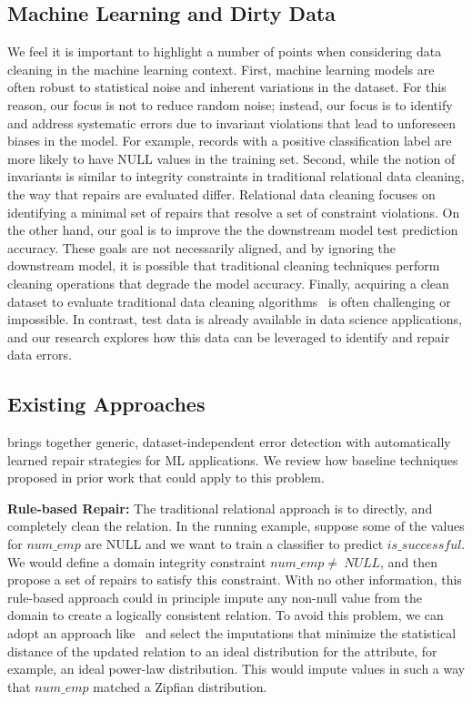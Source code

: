 \subsection{Machine Learning and Dirty Data}
We feel it is important to highlight a number of points when considering data cleaning in the machine learning context.
First, machine learning models are often robust to statistical noise and inherent variations in the dataset.  For this reason, our focus is not to reduce random noise; instead, our focus is to identify and address systematic errors due to invariant violations that lead to unforeseen biases in the model.  
For example, records with a positive classification label are more likely to have NULL values in the training set.
Second, while the notion of invariants is similar to integrity constraints in traditional relational data cleaning, the way that repairs are evaluated differ.  Relational data cleaning focuses on identifying a minimal set of repairs that resolve a set of constraint violations.  On the other hand, our goal is to improve the the downstream model test prediction accuracy.  These goals are not necessarily aligned, and by ignoring the downstream model, it is possible that traditional cleaning techniques perform cleaning operations that degrade the model accuracy.
Finally, acquiring a clean dataset to evaluate traditional data cleaning algorithms~\cite{DBLP:journals/pvldb/AbedjanCDFIOPST16} is often challenging or impossible.  In contrast, test data is already available in data science applications, and our research explores how this data can be leveraged to identify and repair data errors.

\subsection{Existing Approaches}
\sys brings together generic, dataset-independent error detection with automatically learned repair strategies for ML applications.
We review how baseline techniques proposed in prior work that could apply to this problem.

\vspace{0.5em}

\noindent\textbf{Rule-based Repair: } 
The traditional relational approach is to directly, and completely clean the relation.
In the running example, suppose some of the values for $num\_emp$ are NULL and we want to train a classifier to predict $is\_successful$.
We would define a domain integrity constraint $num\_emp \ne~NULL$, and then propose a set of repairs to satisfy this constraint.
With no other information, this rule-based approach could in principle impute any non-null value from the domain to create a logically consistent relation.
To avoid this problem, we can adopt an approach like~\cite{prokoshyna2015combining} and select the imputations that minimize the statistical distance of the updated relation to an ideal distribution for the attribute, for example, an ideal power-law distribution.
This would impute values in such a way that $num\_emp$ matched a Zipfian distribution.

